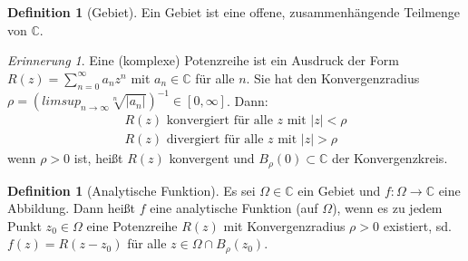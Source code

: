 \documentclass[11pt,titlepage]{article}
\theoremstyle{definition}
\newtheorem{definition}[theorem]{Definition}
\theoremstyle{remark}
\newtheorem*{remind}{Erinnerung}
\begin{document}
	\begin{definition}[Gebiet]
		Ein Gebiet ist eine offene, zusammenhängende Teilmenge von $\mathbb{C}$.
	\end{definition}
	
	\begin{remind}
		Eine (komplexe) Potenzreihe ist ein Ausdruck der Form $R(z)=\sum^{\infty}_{n=0} a_n z^n$ mit 
		$a_n \in \mathbb{C}$ für alle $n$. Sie hat den Konvergenzradius $\rho = \left( limsup_{n\to\infty}
		\sqrt[n]{|a_n |}\right)^{-1} \in [0,\infty]$. Dann:
		\begin{eqnarray*}
			R(z)\text{ konvergiert für alle $z$ mit }|z|< \rho \\
			R(z)\text{ divergiert für alle $z$ mit }|z|> \rho 
		\end{eqnarray*}
		wenn $\rho>0$ ist, heißt $R(z)$ konvergent und $B_{\rho}(0)\subset \mathbb{C}$ der 
		Konvergenzkreis.
	\end{remind}
	
	\begin{definition}[Analytische Funktion]
		Es sei $\Omega\in\mathbb{C}$ ein Gebiet und $f:\Omega\to\mathbb{C}$ eine Abbildung. 
		Dann heißt $f$ eine analytische Funktion (auf $\Omega$), wenn es zu jedem Punkt 
		$z_0 \in \Omega$ eine Potenzreihe $R(z)$ mit Konvergenzradius $\rho>0$ existiert, sd. 
		$f(z)=R(z-z_0 )$ für alle $z\in \Omega\cap B_{\rho}(z_0)$.
	\end{definition}
\end{document}
